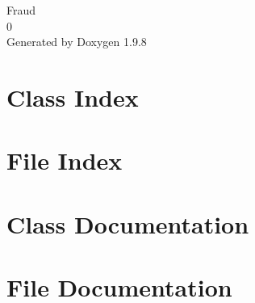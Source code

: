 \documentclass[twoside]{book}
\newcommand{\+}{\discretionary{\mbox{\scriptsize$\hookleftarrow$}}{}{}}
\newcommand{\clearemptydoublepage}{%
    \newpage{\pagestyle{empty}\cleardoublepage}%
  }
\begin{document}
  \raggedbottom
    \hypersetup{pageanchor=false,
                bookmarksnumbered=true,
                pdfencoding=unicode
               }
  \begin{titlepage}
  \vspace*{7cm}
  \begin{center}%
  {\Large Fraud}\\
  [1ex]\large 0 \\
  \vspace*{1cm}
  {\large Generated by Doxygen 1.9.8}\\
  \end{center}
  \end{titlepage}
  \clearemptydoublepage
  \tableofcontents
  \clearemptydoublepage
  \hypersetup{pageanchor=true}
\chapter{Class Index}

\chapter{File Index}

\chapter{Class Documentation}




\chapter{File Documentation}















  \backmatter
  \newpage
  \clearemptydoublepage
  \printindex
\end{document}
